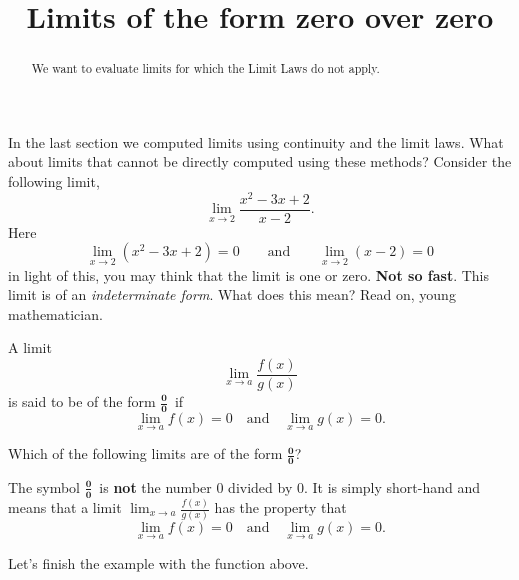 \documentclass{ximera}
\title[Dig-In:]{Limits of the form zero over zero}
\begin{document}
\begin{abstract}
  We want to evaluate limits for which the Limit Laws do not apply. 
\end{abstract}

\maketitle

In the last section we computed  limits 
using continuity and the limit laws. What about limits that cannot be
directly computed using these methods?  Consider the following limit,
\[
\lim_{x\to 2}\frac{x^2-3x+2}{x-2}.
\]
Here 
\[
\lim_{x\to 2}\left(x^2-3x+2\right) = 0\qquad\text{and}\qquad \lim_{x\to
  2}\left(x-2\right) = 0
\]
in light of this, you may think that the limit is one or
zero. \textbf{Not so fast}. This limit is of an \textit{indeterminate
  form}. What does this mean? Read on, young mathematician.

\begin{definition}
  A limit
  \[
  \lim_{x\to a} \frac{f(x)}{g(x)}
  \]
  is said to be of the form $\boldsymbol{\tfrac{0}{0}}$\ if
  \[
  \lim_{x\to a} f(x) = 0\quad\text{and}\quad \lim_{x\to a} g(x) =0.
  \]
\end{definition}

\begin{question}
  Which of the following limits are of the form $\boldsymbol{\tfrac{0}{0}}$?
  \begin{selectAll}
  \end{selectAll}
\end{question}

\begin{warning}
  The symbol $\boldsymbol{\tfrac{0}{0}}$\ is \textbf{not} the number $0$ divided by
  $0$. It is simply short-hand and means that a limit $\lim_{x\to a}
  \frac{f(x)}{g(x)}$ has the property that
  \[
  \lim_{x\to a} f(x) = 0\quad\text{and}\quad \lim_{x\to a} g(x) =0.
  \]
\end{warning}


Let's finish the example with the function above. 
\end{document}

